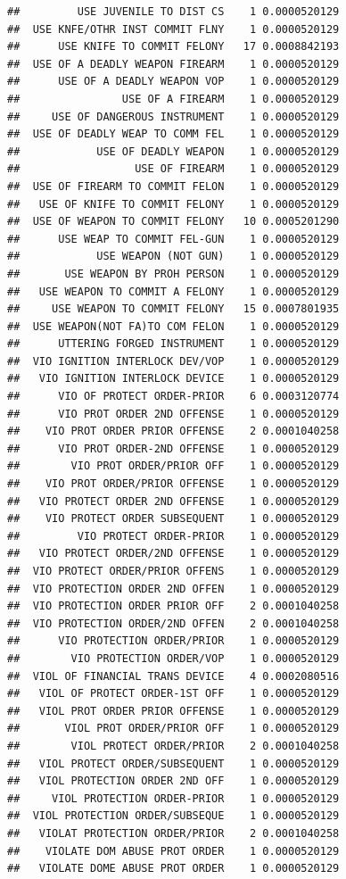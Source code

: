 \documentclass[]{book}
\begin{document}
\begin{verbatim}
##         USE JUVENILE TO DIST CS    1 0.0000520129
##  USE KNFE/OTHR INST COMMIT FLNY    1 0.0000520129
##      USE KNIFE TO COMMIT FELONY   17 0.0008842193
##  USE OF A DEADLY WEAPON FIREARM    1 0.0000520129
##      USE OF A DEADLY WEAPON VOP    1 0.0000520129
##                USE OF A FIREARM    1 0.0000520129
##     USE OF DANGEROUS INSTRUMENT    1 0.0000520129
##  USE OF DEADLY WEAP TO COMM FEL    1 0.0000520129
##            USE OF DEADLY WEAPON    1 0.0000520129
##                  USE OF FIREARM    1 0.0000520129
##  USE OF FIREARM TO COMMIT FELON    1 0.0000520129
##   USE OF KNIFE TO COMMIT FELONY    1 0.0000520129
##  USE OF WEAPON TO COMMIT FELONY   10 0.0005201290
##      USE WEAP TO COMMIT FEL-GUN    1 0.0000520129
##            USE WEAPON (NOT GUN)    1 0.0000520129
##       USE WEAPON BY PROH PERSON    1 0.0000520129
##   USE WEAPON TO COMMIT A FELONY    1 0.0000520129
##     USE WEAPON TO COMMIT FELONY   15 0.0007801935
##  USE WEAPON(NOT FA)TO COM FELON    1 0.0000520129
##      UTTERING FORGED INSTRUMENT    1 0.0000520129
##  VIO IGNITION INTERLOCK DEV/VOP    1 0.0000520129
##   VIO IGNITION INTERLOCK DEVICE    1 0.0000520129
##      VIO OF PROTECT ORDER-PRIOR    6 0.0003120774
##      VIO PROT ORDER 2ND OFFENSE    1 0.0000520129
##    VIO PROT ORDER PRIOR OFFENSE    2 0.0001040258
##      VIO PROT ORDER-2ND OFFENSE    1 0.0000520129
##        VIO PROT ORDER/PRIOR OFF    1 0.0000520129
##    VIO PROT ORDER/PRIOR OFFENSE    1 0.0000520129
##   VIO PROTECT ORDER 2ND OFFENSE    1 0.0000520129
##    VIO PROTECT ORDER SUBSEQUENT    1 0.0000520129
##         VIO PROTECT ORDER-PRIOR    1 0.0000520129
##   VIO PROTECT ORDER/2ND OFFENSE    1 0.0000520129
##  VIO PROTECT ORDER/PRIOR OFFENS    1 0.0000520129
##  VIO PROTECTION ORDER 2ND OFFEN    1 0.0000520129
##  VIO PROTECTION ORDER PRIOR OFF    2 0.0001040258
##  VIO PROTECTION ORDER/2ND OFFEN    2 0.0001040258
##      VIO PROTECTION ORDER/PRIOR    1 0.0000520129
##        VIO PROTECTION ORDER/VOP    1 0.0000520129
##  VIOL OF FINANCIAL TRANS DEVICE    4 0.0002080516
##   VIOL OF PROTECT ORDER-1ST OFF    1 0.0000520129
##   VIOL PROT ORDER PRIOR OFFENSE    1 0.0000520129
##       VIOL PROT ORDER/PRIOR OFF    1 0.0000520129
##        VIOL PROTECT ORDER/PRIOR    2 0.0001040258
##   VIOL PROTECT ORDER/SUBSEQUENT    1 0.0000520129
##   VIOL PROTECTION ORDER 2ND OFF    1 0.0000520129
##     VIOL PROTECTION ORDER-PRIOR    1 0.0000520129
##  VIOL PROTECTION ORDER/SUBSEQUE    1 0.0000520129
##   VIOLAT PROTECTION ORDER/PRIOR    2 0.0001040258
##    VIOLATE DOM ABUSE PROT ORDER    1 0.0000520129
##   VIOLATE DOME ABUSE PROT ORDER    1 0.0000520129

\end{verbatim}
\end{document}
